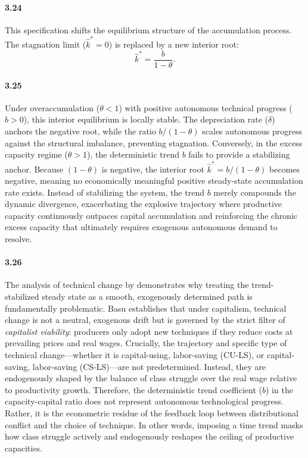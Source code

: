 \paragraph{3.24}
This specification shifts the equilibrium structure of the accumulation process. The stagnation limit ($\hat{k}^* = 0$) is replaced by a new interior root:
\begin{equation}
\hat{k}^* = \frac{b}{1 - \theta}.
\end{equation}

\paragraph{3.25}
Under overaccumulation ($\theta < 1$) with positive autonomous technical progress ($b > 0$), this interior equilibrium is locally stable. The depreciation rate ($\delta$) anchors the negative root, while the ratio $b / (1 - \theta)$ scales autonomous progress against the structural imbalance, preventing stagnation. Conversely, in the excess capacity regime ($\theta > 1$), the deterministic trend $b$ fails to provide a stabilizing anchor. Because $(1 - \theta)$ is negative, the interior root $\hat{k}^* = b / (1 - \theta)$ becomes negative, meaning no economically meaningful positive steady-state accumulation rate exists. Instead of stabilizing the system, the trend $b$ merely compounds the dynamic divergence, exacerbating the explosive trajectory where productive capacity continuously outpaces capital accumulation and reinforcing the chronic excess capacity that ultimately requires exogenous autonomous demand to resolve.

\paragraph{3.26}
The analysis of technical change by \citet{Basu2022} demonstrates why treating the trend-stabilized steady state as a smooth, exogenously determined path is fundamentally problematic. Basu establishes that under capitalism, technical change is not a neutral, exogenous drift but is governed by the strict filter of \textit{capitalist viability}: producers only adopt new techniques if they reduce costs at prevailing prices and real wages. Crucially, the trajectory and specific type of technical change---whether it is capital-using, labor-saving (CU-LS), or capital-saving, labor-saving (CS-LS)---are not predetermined. Instead, they are endogenously shaped by the balance of class struggle over the real wage relative to productivity growth. Therefore, the deterministic trend coefficient ($b$) in the capacity-capital ratio does not represent autonomous technological progress. Rather, it is the econometric residue of the feedback loop between distributional conflict and the choice of technique. In other words, imposing a time trend masks how class struggle actively and endogenously reshapes the ceiling of productive capacities.

